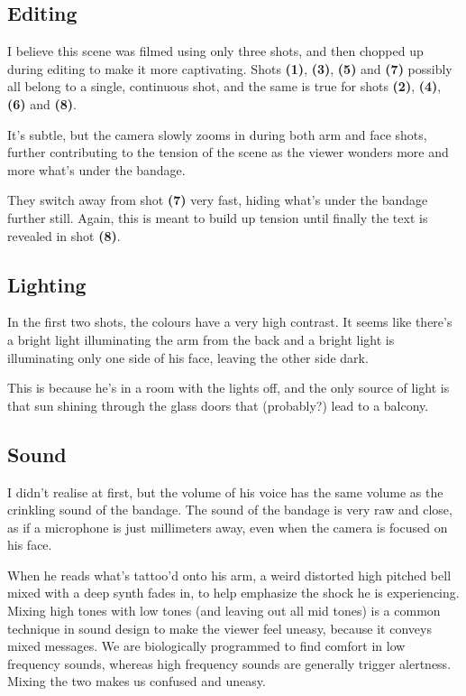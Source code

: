 \documentclass[notitlepage]{fhnwreport}
\begin{document}
\subsection*{Editing}

I believe this scene was filmed using  only  three  shots, and then chopped up
during editing to make  it more captivating. Shots \textbf{(1)}, \textbf{(3)},
\textbf{(5)} and  \textbf{(7)}  possibly  all  belong  to a single, continuous
shot, and the same is true  for shots \textbf{(2)}, \textbf{(4)}, \textbf{(6)}
and \textbf{(8)}.

It's  subtle, but the camera slowly zooms in during both arm and  face  shots,
further contributing to the tension of the scene as  the  viewer  wonders more
and more what's under the bandage.

They switch away from shot  \textbf{(7)}  very  fast,  hiding what's under the
bandage  further still. Again, this is meant to build up tension until finally
the text is revealed in shot \textbf{(8)}.

\subsection*{Lighting}

In the first two shots, the colours have a very high  contrast.  It seems like
there's a bright light illuminating the arm  from  the back and a bright light
is illuminating  only  one  side  of  his  face,  leaving the other side dark.

This  is  because  he's  in a room with the lights off, and the only source of
light is that sun  shining  through the glass doors that (probably?) lead to a
balcony.

\subsection*{Sound}

I didn't realise at  first, but the volume of his voice has the same volume as
the crinkling sound of the bandage.  The  sound of the bandage is very raw and
close, as if a microphone is just millimeters away, even when  the  camera  is
focused on his face.

When  he  reads what's tattoo'd onto his arm, a weird distorted  high  pitched
bell  mixed  with  a  deep  synth fades in, to help emphasize the shock he  is
experiencing. Mixing high tones with low tones (and leaving out all mid tones)
is a common technique in  sound design to make the viewer feel uneasy, because
it  conveys  mixed messages. We are biologically programmed to find comfort in
low frequency sounds, whereas high  frequency  sounds  are  generally  trigger
alertness. Mixing the two makes us confused and uneasy.

\printbibliography
\end{document}
